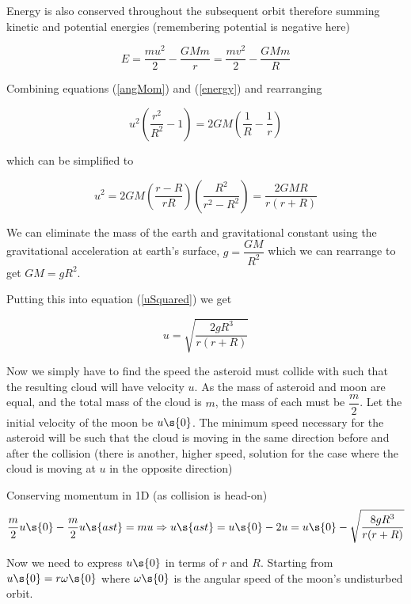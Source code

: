 \begin{problem}
{  Energy is also conserved throughout the subsequent orbit therefore summing kinetic and potential energies (remembering potential is negative here)
  
\begin{equation}
 E = \frac{m u^2}{2} - \frac{GMm}{r} =  \frac{m v^2}{2} - \frac{GMm}{R}
 \label{energy}
 \end{equation}
 
 Combining equations (\ref{angMom}) and (\ref{energy}) and rearranging
 
 \begin{equation*}
 u^2 \left(\frac{r^2}{R^2} - 1\right) = 2GM\left(\frac{1}{R} - \frac{1}{r}\right)
 \end{equation*}
 
 which can be simplified to
 
 \begin{equation}
 u^2 = 2GM \left(\dfrac{r-R}{rR}\right) \left(\dfrac{R^2}{r^2 -R^2}\right) = \dfrac{2GMR}{r(r+R)}
 \label{uSquared}
 \end{equation}
  
  We can eliminate the mass of the earth and gravitational constant using the gravitational acceleration at earth’s surface, $g = \dfrac{GM}{R^2}$ which we can rearrange to get $GM =gR^2$.
  
  Putting this into equation (\ref{uSquared}) we get
  
   \begin{equation*}
 u = \sqrt{\dfrac{2gR^3}{r(r+R)}}
 \end{equation*}
 
 Now we simply have to find the speed the asteroid must collide with such that the resulting cloud will have velocity $u$. As the mass of asteroid and moon are equal, and the total mass of the cloud is $m$, the mass of each must be $\dfrac{m}{2}$. Let the initial velocity of the moon be $u\s{0}$. The minimum speed necessary for the asteroid will be such that the cloud is moving in the same direction before and after the collision (there is another, higher speed, solution for the case where the cloud is moving at $u$ in the opposite direction)
 
  Conserving momentum in 1D (as collision is head-on)
     \begin{equation}
 \frac{m}{2}u\s{0} - \frac{m}{2}u\s{ast} = mu \Rightarrow u\s{ast} = u\s{0} - 2u = u\s{0} - \sqrt{\dfrac{8gR^3}{r(r+R)}}
 \label{uAsteroid}
 \end{equation}
  
  Now we need to express $u\s{0}$ in terms of $r$ and $R$. Starting from $u\s{0} = r \omega\s{0}$ where $\omega\s{0}$ is the angular speed of the moon's undisturbed orbit.
  
}
\end{problem}
